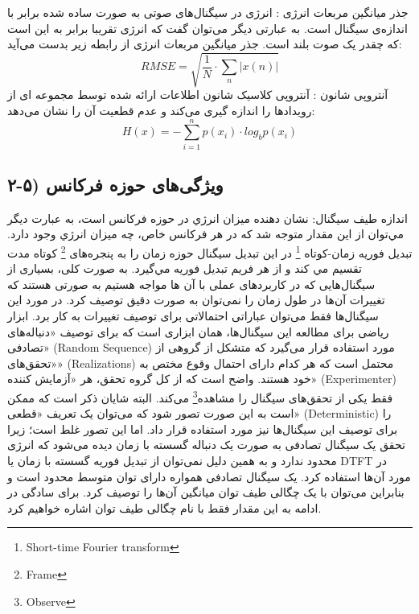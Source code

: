 \documentclass{article}
\begin{document}
جذر میانگین مربعات انرژی : \newline
انرژی در سیگنال‌های صوتی به صورت ساده شده برابر با اندازه‌ی سیگنال است. به عبارتی دیگر می‌توان گفت که انرژی تقریبا برابر به این است که چقدر یک صوت بلند است. جذر میانگین مربعات انرژی از رابطه زیر بدست می‌آید:
\begin{equation}
	RMSE = \sqrt{\dfrac{1}{N}\cdot \sum_{n}^{} |x(n)|}
\end{equation}
آنتروپی شانون :  \newline
آنتروپی کلاسیک شانون اطلاعات ارائه شده توسط مجموعه ای از رویدادها را اندازه گیری می‌کند و عدم قطعیت آن را نشان می‌دهد:
\begin{equation}
	H(x) = - \sum_{i=1}^{n}p(x_{i})\cdot log_{b}p(x_{i})
\end{equation}
\subsection{۲-۵) ویژگی‌های حوزه فرکانس}
اندازه طیف سیگنال:\newline
نشان دهنده ميزان انرژي در حوزه فركانس است، به عبارت ديگر مي‌توان از این مقدار متوجه شد كه در هر فركانس خاص، چه ميزان انرژي وجود دارد. تبدیل فوریه زمان-کوتاه \footnote{Short-time Fourier transform} در اين تبديل سيگنال حوزه زمان را به پنجره‌های \footnote{Frame} كوتاه مدت تقسيم مي کند و از هر فريم تبديل فوريه مي‌گیرد. \newline
به صورت کلی، بسیاری از سیگنال‌هایی که در کاربردهای عملی با آن ها مواجه هستیم به صورتی هستند که تغییرات آن‌ها در طول زمان را نمی‌توان به صورت دقیق توصیف کرد. در مورد این سیگنال‌ها فقط می‌توان عباراتی احتمالاتی برای توصیف تغییرات به کار برد. ابزار ریاضی برای مطالعه این سیگنال‌ها، همان ابزاری است که برای توصیف «دنباله‌های تصادفی» (Random Sequence) مورد استفاده قرار می‌گیرد که متشکل از گروهی از «تحقق‌های» (Realizations) محتمل است که هر کدام دارای احتمال وقوع مختص به خود هستند. واضح است که از کل گروه تحقق، هر «آزمایش کننده» (Experimenter) فقط یکی از تحقق‌های سیگنال را مشاهده\footnote{Observe}  می‌کند.\newline
البته شایان ذکر است که ممکن است به این صورت تصور شود که می‌توان یک تعریف «قطعی» (Deterministic) را برای توصیف این سیگنال‌ها نیز مورد استفاده قرار داد. اما این تصور غلط است؛ زیرا تحقق یک سیگنال تصادفی به صورت یک دنباله گسسته با زمان دیده می‌شود که انرژی محدود ندارد و به همین دلیل نمی‌توان از تبدیل فوریه گسسته با زمان یا DTFT در مورد آن‌ها استفاده کرد. یک سیگنال تصادفی همواره دارای توان متوسط محدود است و بنابراین می‌توان با یک چگالی طیف توان میانگین آن‌ها را توصیف کرد. برای سادگی در ادامه به این مقدار فقط با نام چگالی طیف توان اشاره خواهیم کرد.\newline
\end{document}
